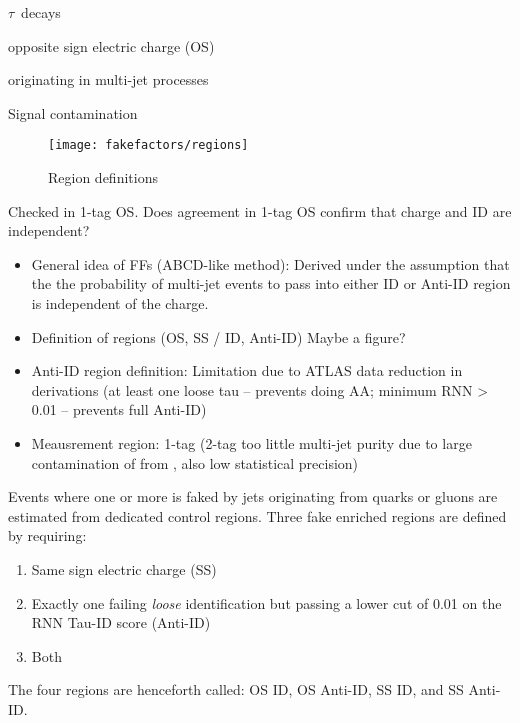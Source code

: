 $\tau$~decays

opposite sign electric charge (OS)

\faketauhadvis originating in multi-jet processes

Signal contamination



\begin{figure}[htbp]
  \centering

  \texttt{[image: fakefactors/regions]}

  \caption{Region definitions}
  \label{fig:fakefactor_regions}
\end{figure}

Checked in 1-tag OS. Does agreement in 1-tag OS confirm that charge
and ID are independent?

\begin{itemize}
\item General idea of FFs (ABCD-like method): Derived under the
  assumption that the the probability of multi-jet events to pass into
  either ID or Anti-ID region is independent of the charge.

\item Definition of regions (OS, SS / ID, Anti-ID) Maybe a figure?

\item Anti-ID region definition: Limitation due to ATLAS data
  reduction in derivations (at least one loose tau -- prevents doing
  AA; minimum RNN > 0.01 -- prevents full Anti-ID)

\item Meausrement region: 1-tag (2-tag too little multi-jet purity due
  to large contamination of \faketauhadvis from \ttbar, also low statistical precision)

\end{itemize}


Events where one or more \tauhadvis is faked by jets originating from quarks or
gluons are estimated from dedicated control regions. Three fake enriched regions
are defined by requiring:
\begin{enumerate}
\item Same sign electric charge \tauhadvis (SS)
\item Exactly one \tauhadvis failing \textit{loose} identification but passing a
  lower cut of 0.01 on the RNN Tau-ID score (Anti-ID)
\item Both
\end{enumerate}
The four regions are henceforth called: OS ID, OS Anti-ID, SS ID, and SS
Anti-ID.

